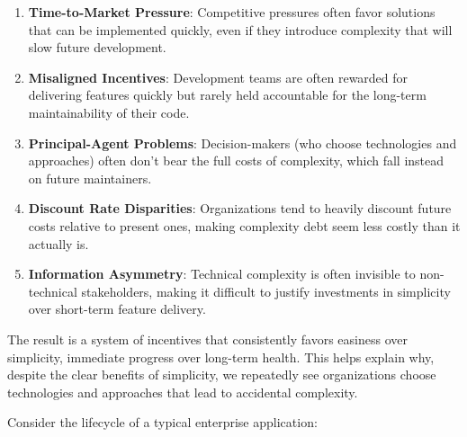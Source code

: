 \documentclass[11pt]{article}
\begin{document}
\begin{enumerate}
\item \textbf{Time-to-Market Pressure}: Competitive pressures often favor solutions that can be implemented quickly, even if they introduce complexity that will slow future development.

\item \textbf{Misaligned Incentives}: Development teams are often rewarded for delivering features quickly but rarely held accountable for the long-term maintainability of their code.

\item \textbf{Principal-Agent Problems}: Decision-makers (who choose technologies and approaches) often don't bear the full costs of complexity, which fall instead on future maintainers.

\item \textbf{Discount Rate Disparities}: Organizations tend to heavily discount future costs relative to present ones, making complexity debt seem less costly than it actually is.

\item \textbf{Information Asymmetry}: Technical complexity is often invisible to non-technical stakeholders, making it difficult to justify investments in simplicity over short-term feature delivery.
\end{enumerate}

The result is a system of incentives that consistently favors easiness over simplicity, immediate progress over long-term health. This helps explain why, despite the clear benefits of simplicity, we repeatedly see organizations choose technologies and approaches that lead to accidental complexity.

Consider the lifecycle of a typical enterprise application:
\end{document}
